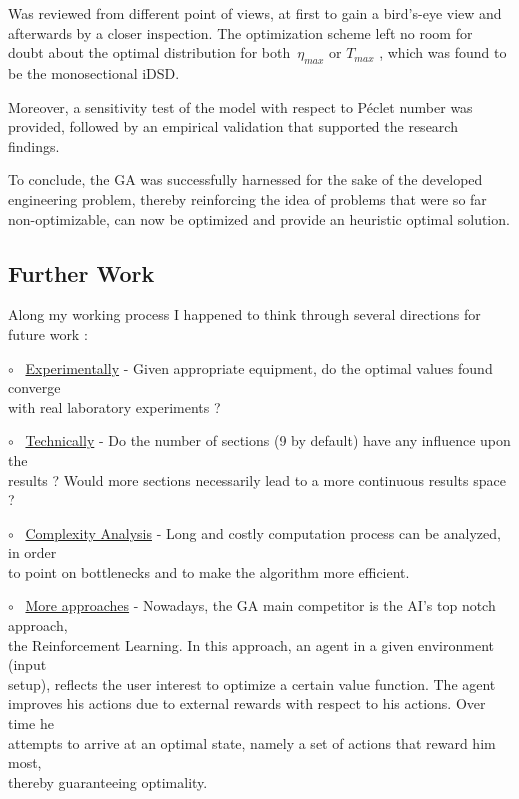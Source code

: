 \documentclass[12pt]{article}
\numberwithin{equation}{section}
\begin{document}
\begin{flushleft}
Was reviewed from different point of views, at first to gain a bird's-eye view and afterwards by a closer inspection. The optimization scheme left no room for doubt about the optimal distribution for both \,$\eta_{max}$  or  $T_{max}$ , which was found to be the monosectional iDSD. 

Moreover, a sensitivity test of the model with respect to Péclet number was provided, followed by an empirical validation that supported the research findings.

To conclude, the GA was successfully harnessed for the sake of the developed engineering problem, thereby reinforcing the idea of problems that were so far non-optimizable, can now be optimized and provide an heuristic optimal solution.

\subsection{Further Work}

Along my working process I happened to think through several directions for future work :

\quad $\circ$ \ \underline{Experimentally} - Given appropriate equipment, do the optimal values found converge  \\ \hspace{8mm} with real laboratory experiments ?

\quad $\circ$ \ \underline{Technically} - Do the number of sections (9 by default) have any influence upon the \\ \hspace{8mm} results ? Would more sections necessarily lead to a more continuous results space ?

\quad $\circ$ \ \underline{Complexity Analysis} - Long and costly computation process can be analyzed, in order  \\ \hspace{8mm} to point on bottlenecks and to make the algorithm more efficient.

\quad $\circ$ \ \underline{More approaches} - Nowadays, the GA main competitor is the AI's top notch approach,  \\ \hspace{8mm} the Reinforcement Learning. In this approach, an agent in a given environment (input  \\ \hspace{8mm} setup), reflects the user interest to optimize a certain value function. The agent  \\ \hspace{8mm} improves his actions due to external rewards with respect to his actions. Over time he \\ \hspace{8mm} attempts to arrive at an optimal state, namely a set of actions that reward him most, \\ \hspace{8mm} thereby guaranteeing optimality.


\end{flushleft}
\end{document}
